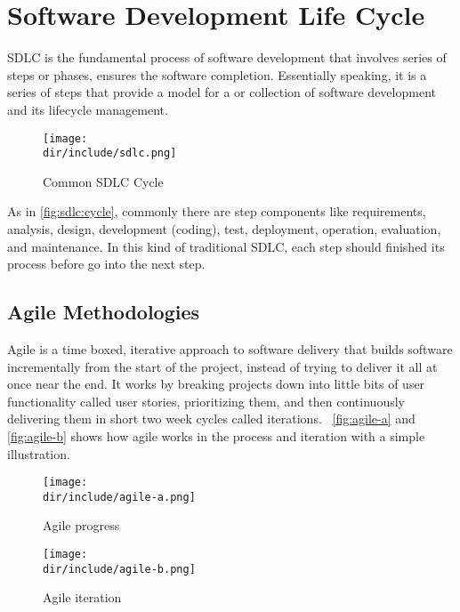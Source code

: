 \section{Software Development Life Cycle}
\label{sec:sdlc}

\ac{SDLC} is the fundamental process of software development that involves series of steps or phases, ensures the software completion.
Essentially speaking, it is a series of steps that provide a model for a or collection of software development and its lifecycle management.

\begin{figure}[htbp]
    \centering
    \texttt{[image: \\dir/include/sdlc.png]}
    \caption{Common SDLC Cycle}
    \label{fig:sdlc:cycle}
\end{figure}

As in \autoref{fig:sdlc:cycle}, commonly there are step components like requirements, analysis, design, development (coding), test, deployment, operation, evaluation, and maintenance.
In this kind of traditional \ac{SDLC}, each step should finished its process before go into the next step.

\subsection{Agile Methodologies}

Agile is a time boxed, iterative approach to software delivery that builds software incrementally from the start of the project, instead of trying to deliver it all at once near the end.
It works by breaking projects down into little bits of user functionality called user stories, prioritizing them, and then continuously delivering them in short two week cycles called iterations.~\autocite{Rasmusson2015Agile}
\autoref{fig:agile-a} and \autoref{fig:agile-b} shows how agile works in the process and iteration with a simple illustration.

\begin{figure}[htbp]
    \centering
    \texttt{[image: \\dir/include/agile-a.png]}
    \caption{Agile progress}
    \label{fig:agile-a}
\end{figure}

\begin{figure}[htbp]
    \centering
    \texttt{[image: \\dir/include/agile-b.png]}
    \caption{Agile iteration}
    \label{fig:agile-b}
\end{figure}

